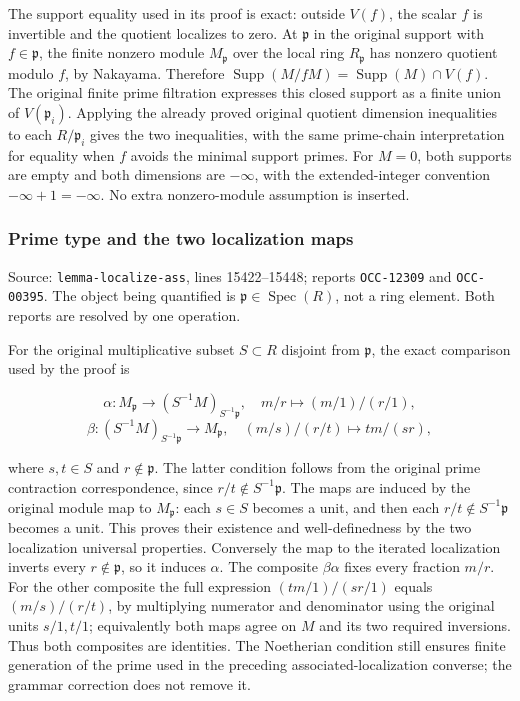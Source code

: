 The support equality used in its proof is exact: outside \(V(f)\), the scalar \(f\) is invertible and the quotient localizes to zero. At \(\mathfrak p\) in the original support with \(f\in\mathfrak p\), the finite nonzero module \(M_{\mathfrak p}\) over the local ring \(R_{\mathfrak p}\) has nonzero quotient modulo \(f\), by Nakayama. Therefore \(\operatorname{Supp}(M/fM)=\operatorname{Supp}(M)\cap V(f)\). The original finite prime filtration expresses this closed support as a finite union of \(V(\mathfrak p_i)\). Applying the already proved original quotient dimension inequalities to each \(R/\mathfrak p_i\) gives the two inequalities, with the same prime-chain interpretation for equality when \(f\) avoids the minimal support primes. For \(M=0\), both supports are empty and both dimensions are \(-\infty\), with the extended-integer convention \(-\infty+1=-\infty\). No extra nonzero-module assumption is inserted.

\subsubsection{Prime type and the two localization maps}\label{prime-type-and-the-two-localization-maps}

Source: \texttt{lemma-localize-ass}, lines 15422--15448; reports \texttt{OCC-12309} and \texttt{OCC-00395}. The object being quantified is \(\mathfrak p\in\operatorname{Spec}(R)\), not a ring element. Both reports are resolved by one operation.

For the original multiplicative subset \(S\subset R\) disjoint from \(\mathfrak p\), the exact comparison used by the proof is

\[
\alpha:M_{\mathfrak p}\longrightarrow(S^{-1}M)_{S^{-1}\mathfrak p},
\quad m/r\longmapsto(m/1)/(r/1),
\] \[
\beta:(S^{-1}M)_{S^{-1}\mathfrak p}\longrightarrow M_{\mathfrak p},
\quad (m/s)/(r/t)\longmapsto tm/(sr),
\]

where \(s,t\in S\) and \(r\notin\mathfrak p\). The latter condition follows from the original prime contraction correspondence, since \(r/t\notin S^{-1}\mathfrak p\). The maps are induced by the original module map to \(M_{\mathfrak p}\): each \(s\in S\) becomes a unit, and then each \(r/t\notin S^{-1}\mathfrak p\) becomes a unit. This proves their existence and well-definedness by the two localization universal properties. Conversely the map to the iterated localization inverts every \(r\notin\mathfrak p\), so it induces \(\alpha\). The composite \(\beta\alpha\) fixes every fraction \(m/r\). For the other composite the full expression \((tm/1)/(sr/1)\) equals \((m/s)/(r/t)\), by multiplying numerator and denominator using the original units \(s/1,t/1\); equivalently both maps agree on \(M\) and its two required inversions. Thus both composites are identities. The Noetherian condition still ensures finite generation of the prime used in the preceding associated-localization converse; the grammar correction does not remove it.

